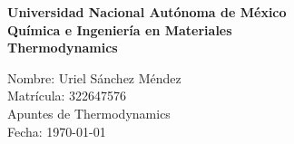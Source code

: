 \documentclass[12pt]{article}
\begin{document}
\begin{titlepage}
\thispagestyle{empty}
\begin{center}
\vspace*{2cm}
\fontsize{14}{30}\selectfont\textbf{Universidad Nacional Autónoma de México} \\
\vspace{1cm}
\fontsize{14}{30}\selectfont\textbf{Química e Ingeniería en Materiales} \\
\vspace{1cm}
\fontsize{14}{30}\selectfont\textbf{Thermodynamics} \\
\end{center}
\vspace{2cm}
\begin{flushright}
    \fontsize{14}{30}\selectfont
        \hspace{2cm} Nombre: Uriel Sánchez Méndez \\
        \hspace{2cm} Matrícula: 322647576 \\
        \hspace{2cm} Apuntes de Thermodynamics \\
        \hspace{2cm} Fecha: \today \\
\end{flushright}
\end{titlepage}

\tableofcontents
\thispagestyle{empty}
\newpage



\end{document}
